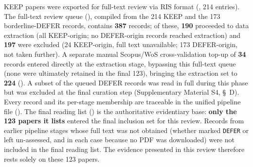 KEEP papers were exported for full-text review via RIS format
(\texttt{}, 214 entries). The full-text
review queue (\texttt{}),
compiled from the 214 KEEP and the 173 borderline-DEFER records, contains
\textbf{387} records; of these, \textbf{190} proceeded to data extraction (all
KEEP-origin; no DEFER-origin records reached extraction) and \textbf{197} were
excluded (24 KEEP-origin, full text unavailable; 173 DEFER-origin, not taken
further). A
separate manual Scopus/WoS cross-validation top-up of \textbf{34} records
entered directly at the extraction stage, bypassing this full-text queue
(none were ultimately retained in the final 123), bringing the extraction
set to \textbf{224} (\texttt{}). A subset of the
queued DEFER records was read in full during this phase but was excluded at
the final curation step (Supplementary Material S4, \S~D).
Every record and its per-stage membership are traceable in the unified
pipeline file (\texttt{}). The final reading list
(\texttt{}) is the authoritative
evidentiary base: \textbf{only the 123 papers it lists} entered the final
inclusion set for this review. Records from earlier pipeline stages whose full
text was not obtained (whether marked \texttt{DEFER} or left un-assessed, and
in each case because no PDF was downloaded) were not included in the final
reading list. The evidence presented in this review therefore rests solely on
these 123 papers.

